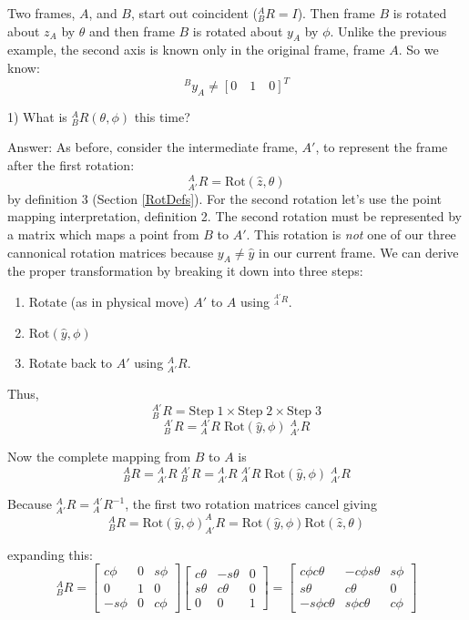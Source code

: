 \begin{Example}\label{RotExampFixedFrame}

Two frames, $A$, and $B$, start out coincident ($^A_BR = I$).  Then frame $B$ is rotated about $z_A$ by $\theta$ and then frame $B$ is rotated about $y_A$ by $\phi$.  Unlike the previous example, the second axis is known only in the original frame, frame $A$. So we know:
\[
^By_A \ne [0 \quad 1 \quad 0]^T
\]


1) What is $^A_BR(\theta,\phi)$ this time?

\vspace{0.2in}

Answer: As before, consider the intermediate frame, $A'$, to represent the frame after the first rotation:
\[
{^A_{A'}}R = \mathrm{Rot}(\hat{z}, \theta)
\]
by definition 3 (Section \ref{RotDefs}).  For the second rotation let's use the point mapping interpretation, definition 2.  The second rotation must be represented by a matrix which maps a point from $B$ to $A'$.  This rotation is {\it not} one of our three cannonical rotation matrices because $y_A \ne \hat{y} $ in our current frame.   We can derive the proper transformation by breaking it down into three steps:


\begin{enumerate}
  \item Rotate (as  in physical move) $A'$ to $A$ using $^{^{A'}_{A}R}$.
  \item $\mathrm{Rot}(\hat{y},\phi)$
  \item Rotate back to $A'$ using $^{A}_{A'}R$.
\end{enumerate}
Thus,
\[
^{A'}_{B}R = \mathrm{Step\;1}\times\mathrm{Step\;2}\times\mathrm{Step\;3}
\]
\[
^{A'}_{B}R =  {{}^{A'}_A}R \; \mathrm{Rot}(\hat{y}, \phi) \; {}^A_{A'}R
\]

Now the complete mapping from $B$ to $A$ is
\[
{^A_B}R =  {^A_{A'}}R \; {^{A'}_B}R = {^A_{A'}}R \; {^{A'}_A}R \; \mathrm{Rot}(\hat{y}, \phi) \; {^A_{A'}}R
\]

Because ${^A_{A'}}R = {^{A'}_A}R^{-1}$, the first two rotation matrices cancel giving
\[
^{A}_BR = \mathrm{Rot}(\hat{y}, \phi)^A_{A'}R = \mathrm{Rot}(\hat{y}, \phi) \mathrm{Rot}(\hat{z}, \theta)
\]

expanding this:
\[
^A_BR = \begin{bmatrix} c\phi & 0 & s\phi \\ 0 & 1 & 0 \\ -s\phi & 0 & c\phi \end{bmatrix}
\begin{bmatrix}
c\theta      & -s\theta     &  0    \\
s\theta      &  c\theta     &  0    \\
   0         &     0        &  1
\end{bmatrix}
=
\begin{bmatrix}
c\phi c\theta     &  -c\phi s\theta    &  s\phi     \\
s\theta           &   c\theta          &  0         \\
-s\phi c\theta    &   s\phi c\theta    &  c\phi
\end{bmatrix}
\]


\end{Example}
